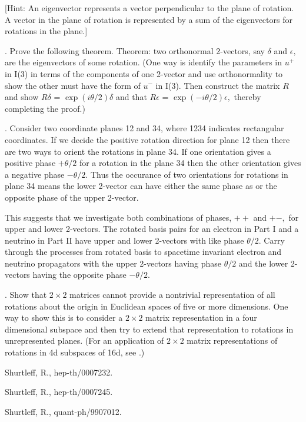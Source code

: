 \documentclass[a4paper,12pt]{article}
\begin{document}
[Hint: An eigenvector represents a vector perpendicular to the plane of rotation. A vector in the plane of rotation is represented by a sum of the eigenvectors for rotations in the plane.]



\vspace{0.3cm}



. Prove the following theorem. Theorem: two orthonormal 2-vectors, say $\delta$ and $\epsilon,$ are the eigenvectors of some rotation. (One way is identify the parameters in $u^{+}$ in I(3) in terms of the components of one 2-vector and use orthonormality to show the other must have the form of $u^{-}$ in I(3). Then construct the matrix $R$ and show $R\delta$ = $\exp{(i\theta/2)} \delta$ and that $R\epsilon$ = $\exp{(-i\theta/2)} \epsilon ,$ thereby completing the proof.) 

 
\pagebreak


\vspace{0.3cm}


. Consider two coordinate planes 12 and 34, where 1234 indicates rectangular coordinates. If we decide the positive rotation direction for plane 12 then there are two ways to orient the rotations in plane 34. If one orientation gives a positive phase $+\theta/2$ for a rotation in the plane 34 then the other orientation gives a negative phase $-\theta/2.$ Thus the occurance of two orientations for rotations in plane 34 means the lower 2-vector can have either the same phase as or the opposite phase of the upper 2-vector. 

	This suggests that we investigate both combinations of phases, $++$ and $+-,$ for upper and lower 2-vectors. The rotated basis pairs for an electron in Part I and a neutrino in Part II have upper and lower 2-vectors with like phase $\theta/2.$ Carry through the processes from rotated basis to spacetime invariant electron and neutrino propagators with the upper 2-vectors having phase $\theta/2$ and the lower 2-vectors having the opposite phase $-\theta/2.$

\vspace{0.3cm}

. Show that $2\times2$ matrices cannot provide a nontrivial representation of all rotations about the origin in Euclidean spaces of five or more dimensions. One way to show this is to consider a $2\times2$ matrix representation in a four dimensional subspace and then try to extend that representation to rotations in unrepresented planes. (For an application of $2\times2$ matrix representations of rotations in 4d subspaces of 16d, see \cite{16d}.)

\begin{thebibliography}{9}

 Shurtleff, R., hep-th/0007232.

 Shurtleff, R., hep-th/0007245.

 Shurtleff, R., quant-ph/9907012.

\end{thebibliography}
\end{document}
